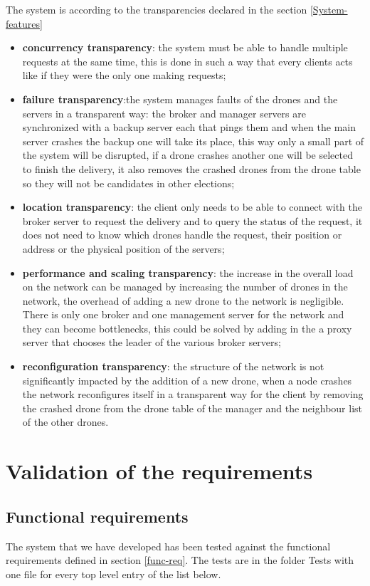 \documentclass[a4paper, oneside]{memoir}
\begin{document}
The system is according to the transparencies declared in the section \ref{System-features}
\begin{itemize}
	\item \textbf{concurrency transparency}: the system must be able to handle multiple requests at the same time, this is done in such a way that every clients acts like if they were the only one making requests;
	\item \textbf{failure transparency}:the system manages faults of the drones and the servers in a transparent way: the broker and manager servers are synchronized with a backup server each that pings them and when the main server crashes the backup one will take its place, this way only a small part of the system will be disrupted, if a drone crashes another one will be selected to finish the delivery, it also removes the crashed drones from the drone table so they will not be candidates in other elections;
	\item \textbf{location transparency}: the client only needs to be able to connect with the broker server to request the delivery and to query the status of the request, it does not need to know which drones handle the request, their position or address or the physical position of the servers;
	\item \textbf{performance and scaling transparency}: the increase in the overall load on the network can be managed by increasing the number of drones in the network, the overhead of adding a new drone to the network is negligible. There is only one broker and one management server for the network and they can become bottlenecks, this could be solved by adding in the a proxy server that chooses the leader of the various broker servers;
	\item \textbf{reconfiguration transparency}: the structure of the network is not significantly impacted by the addition of a new drone, when a node crashes the network reconfigures itself in a transparent way for the client by removing the crashed drone from the drone table of the manager and the neighbour list of the other drones.
\end{itemize}

\section{Validation of the requirements}

\subsection{Functional requirements}
The system that we have developed has been tested against the functional requirements defined in section \ref{func-req}.
The tests are in the folder \textsf{Tests} with one file for every top level entry of the list below.
\end{document}
